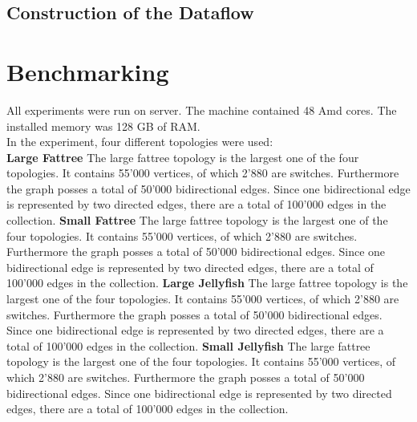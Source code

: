 \documentclass[11pt,singlecolumn]{scrartcl}
\begin{document}
\subsection{Construction of the Dataflow}

\clearpage



\section{Benchmarking}
All experiments were run on server. The machine contained 48 Amd cores. The installed memory was 128 GB of RAM.\\
In the experiment, four different topologies were used:\\
\textbf{Large Fattree}  The large fattree topology is the largest one of the four topologies. It contains 55'000 vertices, of which 2'880 are switches. Furthermore the graph posses a total of 50'000 bidirectional edges. Since one bidirectional edge is represented by two directed edges, there are a total of 100'000 edges in the collection.
\textbf{Small Fattree}  The large fattree topology is the largest one of the four topologies. It contains 55'000 vertices, of which 2'880 are switches. Furthermore the graph posses a total of 50'000 bidirectional edges. Since one bidirectional edge is represented by two directed edges, there are a total of 100'000 edges in the collection.
\textbf{Large Jellyfish}  The large fattree topology is the largest one of the four topologies. It contains 55'000 vertices, of which 2'880 are switches. Furthermore the graph posses a total of 50'000 bidirectional edges. Since one bidirectional edge is represented by two directed edges, there are a total of 100'000 edges in the collection.
\textbf{Small Jellyfish}  The large fattree topology is the largest one of the four topologies. It contains 55'000 vertices, of which 2'880 are switches. Furthermore the graph posses a total of 50'000 bidirectional edges. Since one bidirectional edge is represented by two directed edges, there are a total of 100'000 edges in the collection.
\clearpage
\end{document}
